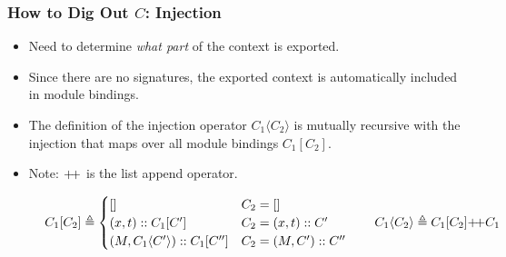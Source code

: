 \documentclass{beamer}
\newcommand*{\cons}{::}
\newcommand*{\mapinject}[2]{{#1}[{#2}]}
\newcommand*{\inject}[2]{{#1}\langle{#2}\rangle}
\begin{document}
\begin{frame}[c]
  \frametitle{How to Dig Out $C$: Injection}
  \begin{itemize}
    \item Need to determine \emph{what part} of the context is exported.
    \item Since there are no signatures, the exported context is automatically included in module bindings.
    \item The definition of the injection operator $\inject{C_1}{C_2}$ is mutually recursive with the injection that maps over all module bindings $\mapinject{C_1}{C_2}$.
    \item Note: $+\mkern-3mu+$ is the list append operator.
  \end{itemize}
  \begin{figure}[h!]
    \footnotesize
    \[
      \mapinject{C_{1}}{C_{2}}\triangleq
      \begin{cases}
        []                                                 & C_{2}=[]              \\
        (x, t)\cons\mapinject{C_{1}}{C'}                   & C_{2}=(x,t)\cons C'   \\
        (M, \inject{C_{1}}{C'})\cons\mapinject{C_{1}}{C''} & C_{2}=(M,C')\cons C''
      \end{cases}
      \qquad
      \inject{C_{1}}{C_{2}}\triangleq \mapinject{C_{1}}{C_{2}}{+\mkern-3mu+} C_{1}
    \]
  \end{figure}
\end{frame}
\end{document}
